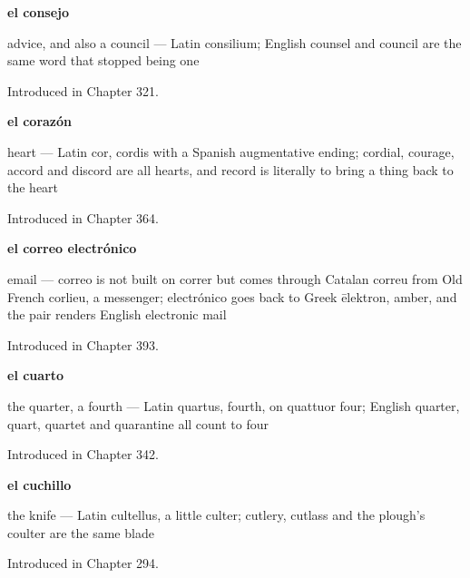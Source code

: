 \noindent\begin{minipage}[t]{\linewidth}
\raggedright
\textbf{el consejo}\par
\small advice, and also a council — Latin consilium; English counsel and council are the same word that stopped being one\par
\footnotesize Introduced in Chapter 321.
\end{minipage}\par\medskip

\noindent\begin{minipage}[t]{\linewidth}
\raggedright
\textbf{el corazón}\par
\small heart — Latin cor, cordis with a Spanish augmentative ending; cordial, courage, accord and discord are all hearts, and record is literally to bring a thing back to the heart\par
\footnotesize Introduced in Chapter 364.
\end{minipage}\par\medskip

\noindent\begin{minipage}[t]{\linewidth}
\raggedright
\textbf{el correo electrónico}\par
\small email — correo is not built on correr but comes through Catalan correu from Old French corlieu, a messenger; electrónico goes back to Greek ēlektron, amber, and the pair renders English electronic mail\par
\footnotesize Introduced in Chapter 393.
\end{minipage}\par\medskip

\noindent\begin{minipage}[t]{\linewidth}
\raggedright
\textbf{el cuarto}\par
\small the quarter, a fourth — Latin quartus, fourth, on quattuor four; English quarter, quart, quartet and quarantine all count to four\par
\footnotesize Introduced in Chapter 342.
\end{minipage}\par\medskip

\noindent\begin{minipage}[t]{\linewidth}
\raggedright
\textbf{el cuchillo}\par
\small the knife — Latin cultellus, a little culter; cutlery, cutlass and the plough's coulter are the same blade\par
\footnotesize Introduced in Chapter 294.
\end{minipage}\par\medskip

